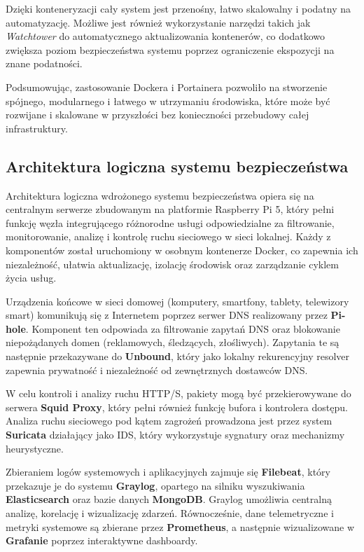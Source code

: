 \documentclass[
    left=2.5cm,         %
    right=2.5cm,        %
    top=2.5cm,          %
    bottom=3cm,         %
    bindingoffset=6mm,  %
    nohyphenation=true %
]{eiti/eiti-thesis} %
\begin{document}
Dzięki konteneryzacji cały system jest przenośny, łatwo skalowalny i podatny na automatyzację. Możliwe jest również wykorzystanie narzędzi takich jak \textit{Watchtower} do automatycznego aktualizowania kontenerów, co dodatkowo zwiększa poziom bezpieczeństwa systemu poprzez ograniczenie ekspozycji na znane podatności.

Podsumowując, zastosowanie Dockera i Portainera pozwoliło na stworzenie spójnego, modularnego i łatwego w utrzymaniu środowiska, które może być rozwijane i skalowane w przyszłości bez konieczności przebudowy całej infrastruktury.

\subsection{Architektura logiczna systemu bezpieczeństwa}

Architektura logiczna wdrożonego systemu bezpieczeństwa opiera się na centralnym serwerze zbudowanym na platformie Raspberry Pi 5, który pełni funkcję węzła integrującego różnorodne usługi odpowiedzialne za filtrowanie, monitorowanie, analizę i kontrolę ruchu sieciowego w sieci lokalnej. Każdy z komponentów został uruchomiony w osobnym kontenerze Docker, co zapewnia ich niezależność, ułatwia aktualizację, izolację środowisk oraz zarządzanie cyklem życia usług.

Urządzenia końcowe w sieci domowej (komputery, smartfony, tablety, telewizory smart) komunikują się z Internetem poprzez serwer DNS realizowany przez \textbf{Pi-hole}. Komponent ten odpowiada za filtrowanie zapytań DNS oraz blokowanie niepożądanych domen (reklamowych, śledzących, złośliwych). Zapytania te są następnie przekazywane do \textbf{Unbound}, który jako lokalny rekurencyjny resolver zapewnia prywatność i niezależność od zewnętrznych dostawców DNS.

W celu kontroli i analizy ruchu HTTP/S, pakiety mogą być przekierowywane do serwera \textbf{Squid Proxy}, który pełni również funkcję bufora i kontrolera dostępu. Analiza ruchu sieciowego pod kątem zagrożeń prowadzona jest przez system \textbf{Suricata} działający jako IDS, który wykorzystuje sygnatury oraz mechanizmy heurystyczne.

Zbieraniem logów systemowych i aplikacyjnych zajmuje się \textbf{Filebeat}, który przekazuje je do systemu \textbf{Graylog}, opartego na silniku wyszukiwania \textbf{Elasticsearch} oraz bazie danych \textbf{MongoDB}. Graylog umożliwia centralną analizę, korelację i wizualizację zdarzeń. Równocześnie, dane telemetryczne i metryki systemowe są zbierane przez \textbf{Prometheus}, a następnie wizualizowane w \textbf{Grafanie} poprzez interaktywne dashboardy.
\end{document}
